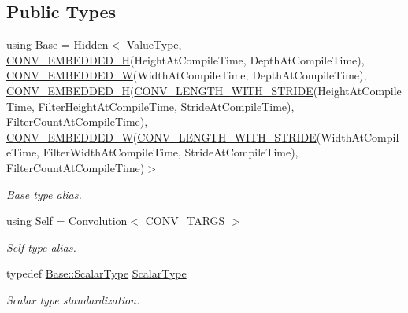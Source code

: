 \subsection*{Public Types}
\begin{DoxyCompactItemize}
\item 
using \hyperlink{classffnn_1_1layer_1_1_convolution_a0c1ce0c94acedcfce2cc663262928c78}{Base} = \hyperlink{classffnn_1_1layer_1_1_hidden}{Hidden}$<$ Value\-Type, \hyperlink{convolution_8h_aa3e0ccfe3f80f1cbfd2883afcd39bba1}{C\-O\-N\-V\-\_\-\-E\-M\-B\-E\-D\-D\-E\-D\-\_\-\-H}(Height\-At\-Compile\-Time, Depth\-At\-Compile\-Time), \hyperlink{convolution_8h_a0fc2446589d9cda3500aeca0c3ab5dbc}{C\-O\-N\-V\-\_\-\-E\-M\-B\-E\-D\-D\-E\-D\-\_\-\-W}(Width\-At\-Compile\-Time, Depth\-At\-Compile\-Time), \hyperlink{convolution_8h_aa3e0ccfe3f80f1cbfd2883afcd39bba1}{C\-O\-N\-V\-\_\-\-E\-M\-B\-E\-D\-D\-E\-D\-\_\-\-H}(\hyperlink{convolution_8h_a33855ffebcdb1997625c0592f537b32c}{C\-O\-N\-V\-\_\-\-L\-E\-N\-G\-T\-H\-\_\-\-W\-I\-T\-H\-\_\-\-S\-T\-R\-I\-D\-E}(Height\-At\-Compile\-Time, Filter\-Height\-At\-Compile\-Time, Stride\-At\-Compile\-Time), Filter\-Count\-At\-Compile\-Time), \hyperlink{convolution_8h_a0fc2446589d9cda3500aeca0c3ab5dbc}{C\-O\-N\-V\-\_\-\-E\-M\-B\-E\-D\-D\-E\-D\-\_\-\-W}(\hyperlink{convolution_8h_a33855ffebcdb1997625c0592f537b32c}{C\-O\-N\-V\-\_\-\-L\-E\-N\-G\-T\-H\-\_\-\-W\-I\-T\-H\-\_\-\-S\-T\-R\-I\-D\-E}(Width\-At\-Compile\-Time, Filter\-Width\-At\-Compile\-Time, Stride\-At\-Compile\-Time), Filter\-Count\-At\-Compile\-Time)$>$
\begin{DoxyCompactList}\small\item\em Base type alias. \end{DoxyCompactList}\item 
using \hyperlink{classffnn_1_1layer_1_1_convolution_a5eb9cca724b3a80a83f9edb685e3178e}{Self} = \hyperlink{classffnn_1_1layer_1_1_convolution}{Convolution}$<$ \hyperlink{convolution_8h_a30c3dcfd336a244f4421fe701352d1e4}{C\-O\-N\-V\-\_\-\-T\-A\-R\-G\-S} $>$
\begin{DoxyCompactList}\small\item\em Self type alias. \end{DoxyCompactList}\item 
typedef \hyperlink{classffnn_1_1layer_1_1internal_1_1_interface_a7f834e3365e5199bcbcd16d9abd63941}{Base\-::\-Scalar\-Type} \hyperlink{classffnn_1_1layer_1_1_convolution_a142c2bcfa2f5a5aad567d3c278e1f46f}{Scalar\-Type}
\begin{DoxyCompactList}\small\item\em Scalar type standardization. \end{DoxyCompactList}\item 

\end{DoxyCompactItemize}
